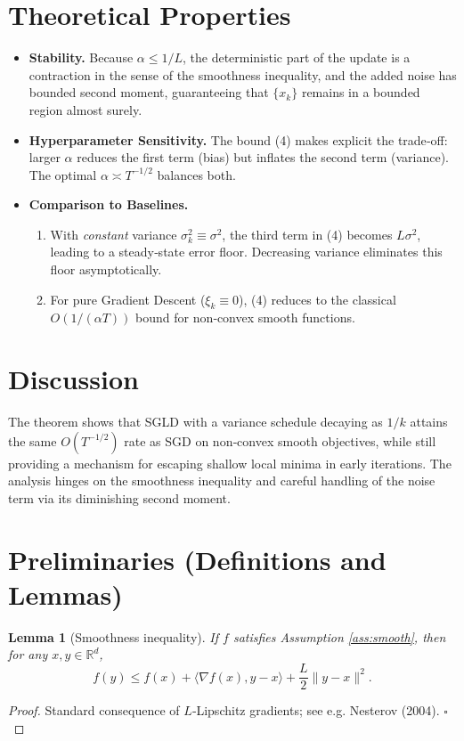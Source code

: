 \documentclass{article}
\newtheorem{lemma}{Lemma}
\newcommand{\R}{\mathbb{R}}
\begin{document}
\section*{Theoretical Properties}
\begin{itemize}
\item \textbf{Stability.} Because $\alpha\le 1/L$, the deterministic part of the update is a contraction in the sense of the smoothness inequality, and the added noise has bounded second moment, guaranteeing that $\{x_k\}$ remains in a bounded region almost surely.
\item \textbf{Hyperparameter Sensitivity.} The bound (4) makes explicit the trade‑off: larger $\alpha$ reduces the first term (bias) but inflates the second term (variance). The optimal $\alpha\asymp T^{-1/2}$ balances both.
\item \textbf{Comparison to Baselines.}
    \begin{enumerate}
    \item With \emph{constant} variance $\sigma_k^2\equiv\sigma^2$, the third term in (4) becomes $L\sigma^2$, leading to a steady‑state error floor. Decreasing variance eliminates this floor asymptotically.
    \item For pure Gradient Descent ($\xi_k\equiv0$), (4) reduces to the classical $O(1/(\alpha T))$ bound for non‑convex smooth functions.
    \end{enumerate}
\end{itemize}

\section*{Discussion}
The theorem shows that SGLD with a variance schedule decaying as $1/k$ attains the same $O(T^{-1/2})$ rate as SGD on non‑convex smooth objectives, while still providing a mechanism for escaping shallow local minima in early iterations. The analysis hinges on the smoothness inequality and careful handling of the noise term via its diminishing second moment.

\newpage
\section*{Preliminaries (Definitions and Lemmas)}
\begin{lemma}[Smoothness inequality]\label{lem:smooth}
If $f$ satisfies Assumption \ref{ass:smooth}, then for any $x,y\in\R^{d}$,
\[
f(y)\le f(x)+\langle\nabla f(x),y-x\rangle+\frac{L}{2}\|y-x\|^{2}.
\tag{L1}
\]
\end{lemma}
\begin{proof}
Standard consequence of $L$‑Lipschitz gradients; see e.g. Nesterov (2004). \hfill $\square$
\end{proof}
\end{document}
